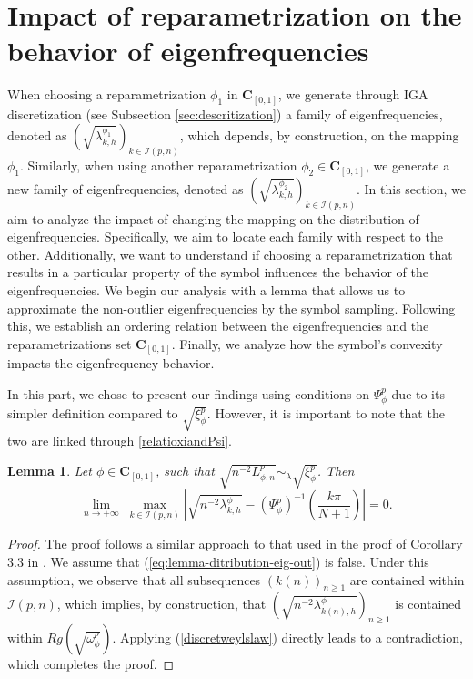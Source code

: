\documentclass[11pt]{article}
\newtheorem{lemma}{Lemma}[section]
\begin{document}
\section{Impact of reparametrization on the behavior of eigenfrequencies}\label{sec4:impactofmapping}
When choosing a reparametrization $\phi_1$ in $\mathbf{C}_{[0,1]}$, we generate through IGA discretization (see Subsection \ref{sec:descritization}) a family of eigenfrequencies, denoted as $\left(\sqrt{\lambda_{k,h}^{\phi_1}}\right)_{k \in \mathcal{I}(p,n)}$, which depends, by construction, on the mapping $\phi_1$. Similarly, when using another reparametrization $\phi_2\in\mathbf{C}_{[0,1]}$, we generate a new family of eigenfrequencies, denoted as $\left(\sqrt{\lambda_{k,h}^{\phi_2}}\right)_{k \in \mathcal{I}(p,n)}$. In this section, we aim to analyze the impact of changing the mapping on the distribution of eigenfrequencies. Specifically, we aim to locate each family with respect to the other. Additionally, we want to understand if choosing a reparametrization that results in a particular property of the symbol influences the behavior of the eigenfrequencies. We begin our analysis with a lemma that allows us to approximate the non-outlier eigenfrequencies by the symbol sampling. Following this, we establish an ordering relation between the eigenfrequencies and the reparametrizations set $\mathbf{C}_{[0,1]}$. Finally, we analyze how the symbol's convexity impacts the eigenfrequency behavior.

In this part, we chose to present our findings using conditions on $\Psi^p_{\phi}$ due to its simpler definition compared to $\sqrt{\xi_{\phi}^p}$. However, it is important to note that the two are linked through \eqref{relatioxiandPsi}.

\begin{lemma}\label{approximationwithoutout}
Let $\phi\in\mathbf{C}_{[0,1]}$, such that  $\sqrt{n^{-2}L_{\phi,n}^p}\sim_{\lambda} \sqrt{ \xi^p_{\phi}}$. Then
\begin{equation}\label{eq:lemma-ditribution-eig-out}
\lim_{n \rightarrow +\infty}\;\max_{k \in \mathcal{I}(p,n)}\left|    \sqrt{n^{-2}\lambda_{k,h}^{\phi}}   -  \left(\Psi^{p}_{\phi}\right)^{-1}\left(\frac{k\pi}{N+1}\right)\right|= 0.
\end{equation}
\end{lemma}

\begin{proof}
    The proof follows a similar approach to that used in the proof of Corollary 3.3 in \cite{bianchi2021analysis}. We assume that (\ref{eq:lemma-ditribution-eig-out}) is false. Under this assumption, we observe that all subsequences $(k(n))_{n\geq1}$ are contained within $\mathcal{I}(p,n)$, which implies, by construction, that $\left( \sqrt{n^{-2}\lambda_{k(n),h}^{\phi}}\right)_{n\geq1}$ is contained within $Rg\left(\sqrt{\omega_{\phi}^p}\right)$. Applying (\ref{discretweylslaw}) directly leads to a contradiction, which completes the proof.
\end{proof}
\end{document}
